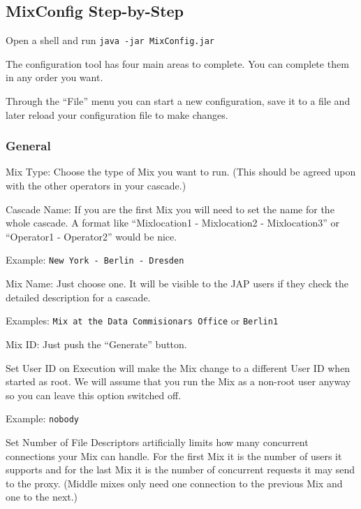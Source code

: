 \documentclass{article}
\begin{document}
\subsection{MixConfig Step-by-Step}

Open a shell and run \verb|java -jar MixConfig.jar|

The configuration tool has four main areas to complete.
You can complete them in any order you want.

Through the ``File'' menu you can start a new configuration, save it
to a file and later reload your configuration file to make changes.

\subsubsection{General}

\begin{description}

\item{Mix Type}: Choose the type of Mix you want to run. (This should be agreed upon
  with the other operators in your cascade.)

\item{Cascade Name}: If you are the first Mix you will need to set the name for the whole
  cascade.  A format like ``Mixlocation1 - Mixlocation2 - Mixlocation3''
  or ``Operator1 - Operator2'' would be nice. 
  
  Example: \verb|New York - Berlin - Dresden| 

\item{Mix Name}: Just choose one. It will be visible to the JAP users
  if they check the detailed description for a cascade.
  
  Examples: \verb|Mix at the Data Commisionars Office| or \verb|Berlin1|

\item{Mix ID}: Just push the ``Generate'' button.
  
\item{Set User ID on Execution} will make the Mix change to a
  different User ID when started as root. We will assume that you run
  the Mix as a non-root user anyway so you can leave this option
  switched off.

  Example: \texttt{nobody}
  
\item{Set Number of File Descriptors} artificially limits how many
  concurrent connections your Mix can handle. For the first Mix it is
  the number of users it supports and for the last Mix it is the
  number of concurrent requests it may send to the proxy. (Middle
  mixes only need one connection to the previous Mix and one to the
  next.)
  
\end{description}
\end{document}
